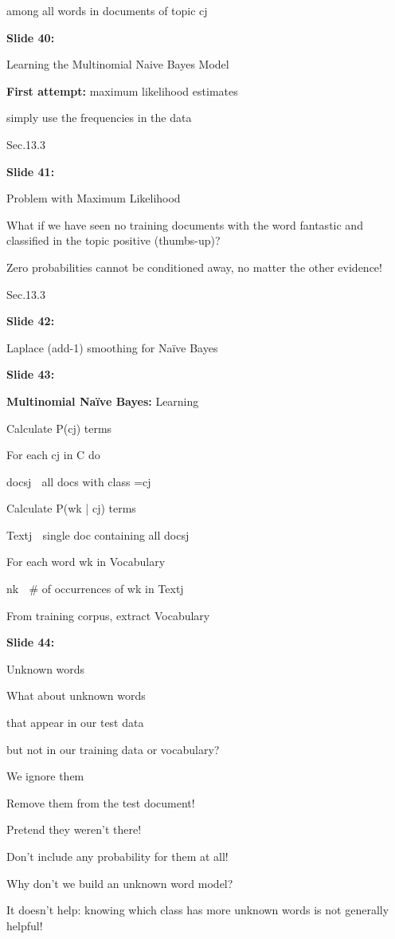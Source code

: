 \documentclass[11pt,a4paper]{article}
\begin{document}
among all words in documents of topic cj

\textbf{Slide 40:}

Learning the Multinomial Naive Bayes Model

\textbf{First attempt:}  maximum likelihood estimates

simply use the frequencies in the data

Sec.13.3

\textbf{Slide 41:}

Problem with Maximum Likelihood

What if we have seen no training documents with the word fantastic  and classified in the topic positive (thumbs-up)?

Zero probabilities cannot be conditioned away, no matter the other evidence!

Sec.13.3

\textbf{Slide 42:}

Laplace (add-1) smoothing for Naïve Bayes

\textbf{Slide 43:}

\textbf{Multinomial Naïve Bayes:}  Learning

Calculate P(cj) terms

For each cj in C do

docsj  all docs with  class =cj

Calculate P(wk | cj) terms

Textj  single doc containing all docsj

For each word wk in Vocabulary

nk  \# of occurrences of wk in Textj

From training corpus, extract Vocabulary

\textbf{Slide 44:}

Unknown words

What about unknown words

that appear in our test data

but not in our training data or vocabulary?

We ignore them

Remove them from the test document!

Pretend they weren't there!

Don't include any probability for them at all!

Why don't we build an unknown word model?

It doesn't help: knowing which class has more unknown words is not generally helpful!
\end{document}
